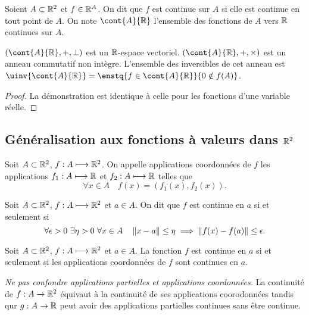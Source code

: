 \begin{defdef}
  Soient $A \subset \mathbb{R}^2$ et $f \in \mathbb{R}^A$. On dit que $f$ est continue sur $A$ si elle est continue en tout point de $A$. On note $\cont{A}{\R}$ l'ensemble des fonctions de $A$ vers $\mathbb{R}$ continues sur $A$.
\end{defdef}
\begin{prop}
  $(\cont{A}{\R}, +, \perp)$ est un $\mathbb{R}$-espace vectoriel. $(\cont{A}{\R}, +, \times)$ est un anneau commutatif non intègre. L'ensemble des inversibles de cet anneau est $\uinv{\cont{A}{\R}} = \enstq{f \in \cont{A}{\R}}{0 \notin f(A)}$.
\end{prop}
\begin{proof}
  La démonstration est identique à celle pour les fonctions d'une variable réelle.
\end{proof}
%

\subsection{Généralisation aux fonctions à valeurs dans $\mathbb{R}^2$}

\begin{defdef}
  Soit $A \subset \mathbb{R}^2$, $f : A \longmapsto \mathbb{R}^2$. On appelle applications coordonnées de $f$ les applications $f_1 : A \longmapsto \mathbb{R}$ et $f_2 : A \longmapsto \mathbb{R}$ telles que
  \begin{equation}
    \forall x \in A \quad f(x) = (f_1(x), f_2(x)).
  \end{equation}
\end{defdef}
\begin{defdef}
  Soit $A \subset \mathbb{R}^2$, $f : A \longmapsto \mathbb{R}^2$ et $a \in A$. On dit que $f$ est continue en $a$ si et seulement si
  \begin{equation}
    \forall \epsilon>0 \ \exists \eta>0 \ \forall x \in A \quad \norme{x-a}\leq \eta \implies \norme{f(x)-f(a)}\leq \epsilon.
  \end{equation}
\end{defdef}
\begin{prop}
  Soit $A \subset \mathbb{R}^2$, $f : A \longmapsto \mathbb{R}^2$ et $a \in A$. La fonction $f$ est continue en $a$ si et seulement si les applications coordonnées de $f$ sont continues en $a$.
\end{prop}

\emph{Ne pas confondre applications partielles et applications coordonnées.} La continuité de $f : A \rightarrow \mathbb{R}^2$ équivaut à la continuité de ses applications coorodonnées tandis qur $g : A \rightarrow \mathbb{R}$ peut avoir des applications partielles continues sans être continue.

